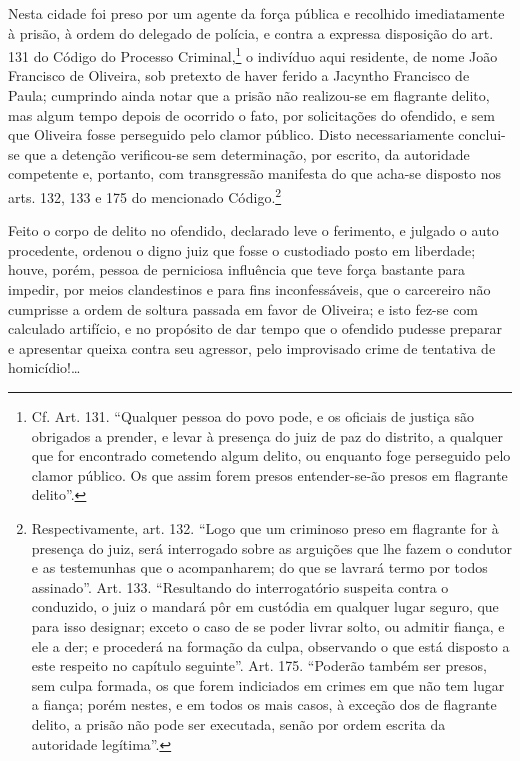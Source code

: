 Nesta cidade foi preso por um agente da força pública e recolhido
imediatamente à prisão, à ordem do delegado de polícia, e contra a
expressa disposição do art. 131 do Código do Processo
Criminal,\footnote{ Cf. Art. 131. ``Qualquer pessoa do povo pode, e os
  oficiais de justiça são obrigados a prender, e levar à presença do
  juiz de paz do distrito, a qualquer que for encontrado cometendo algum
  delito, ou enquanto foge perseguido pelo clamor público. Os que assim
  forem presos entender-se-ão presos em flagrante delito''.} o indivíduo
aqui residente, de nome João Francisco de Oliveira, sob pretexto de
haver ferido a Jacyntho Francisco de Paula; cumprindo ainda notar que a
prisão não realizou-se em flagrante delito, mas algum tempo depois de
ocorrido o fato, por solicitações do ofendido, e sem que Oliveira fosse
perseguido pelo clamor público. Disto necessariamente conclui-se que a
detenção verificou-se sem determinação, por escrito, da autoridade
competente e, portanto, com transgressão manifesta do que acha-se
disposto nos arts. 132, 133 e 175 do mencionado Código.\footnote{
  Respectivamente, art. 132. ``Logo que um criminoso preso em flagrante
  for à presença do juiz, será interrogado sobre as arguições que lhe
  fazem o condutor e as testemunhas que o acompanharem; do que se
  lavrará termo por todos assinado''. Art. 133. ``Resultando do
  interrogatório suspeita contra o conduzido, o juiz o mandará pôr em
  custódia em qualquer lugar seguro, que para isso designar; exceto o
  caso de se poder livrar solto, ou admitir fiança, e ele a der; e
  procederá na formação da culpa, observando o que está disposto a este
  respeito no capítulo seguinte''. Art. 175. ``Poderão também ser presos,
  sem culpa formada, os que forem indiciados em crimes em que não tem
  lugar a fiança; porém nestes, e em todos os mais casos, à exceção dos
  de flagrante delito, a prisão não pode ser executada, senão por ordem
  escrita da autoridade legítima''.}

Feito o corpo de delito no ofendido, declarado leve o ferimento, e
julgado o auto procedente, ordenou o digno juiz que fosse o custodiado
posto em liberdade; houve, porém, pessoa de perniciosa influência que
teve força bastante para impedir, por meios clandestinos e para fins
inconfessáveis, que o carcereiro não cumprisse a ordem de soltura
passada em favor de Oliveira; e isto fez-se com calculado artifício, e
no propósito de dar tempo que o ofendido pudesse preparar e apresentar
queixa contra seu agressor, pelo improvisado crime de tentativa de
homicídio!\ldots{}


